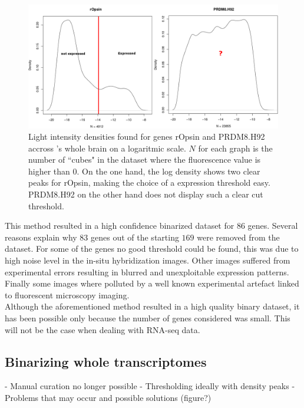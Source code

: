 	\begin{figure}[bth]
\centerline{\includegraphics[width=\linewidth]{gfx/chapter2/densities_bina.png}}
\caption{Light intensity densities found for genes rOpsin and PRDM8.H92 accross \platy{}'s whole brain on a logaritmic scale. $N$ for each graph is the number of ``cubes" in the dataset where the fluorescence value is higher than $0$. On the one hand, the log density shows two clear peaks for rOpsin, making the choice of a expression threshold easy. PRDM8.H92 on the other hand does not display such a clear cut threshold.}\label{fig:densities_bina}
	\end{figure}
	
	This method resulted in a high confidence binarized dataset for $86$ genes. Several reasons explain why $83$ genes out of the starting $169$ were removed from the dataset. For some of the genes no good threshold could be found, this was due to high noise level in the in-situ hybridization images. Other images suffered from experimental errors resulting in blurred and unexploitable expression patterns. Finally some images where polluted by a well known experimental artefact linked to fluorescent microscopy imaging.\\
	
	Although the aforementioned method resulted in a high quality binary dataset, it has been possible only because the number of genes considered was small. This will not be the case when dealing with RNA-seq data.
	


  \subsection*{Binarizing whole transcriptomes}
    - Manual curation no longer possible
    - Thresholding ideally with density peaks
    - Problems that may occur and possible solutions (figure?)

